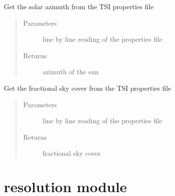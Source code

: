 \documentclass[letterpaper,10pt,english]{sphinxmanual}
\begin{document}

\begin{fulllineitems}
\label{\detokenize{read_properties_file:read_properties_file.get_azimuth}}
Get the solar azimuth from the TSI properties file
\begin{quote}\begin{description}
\item[{Parameters}] \leavevmode
{} \textendash{} line by line reading of the properties file

\item[{Returns}] \leavevmode
azimuth of the sun

\end{description}\end{quote}

\end{fulllineitems}


\begin{fulllineitems}
\label{\detokenize{read_properties_file:read_properties_file.get_fractional_sky_cover_tsi}}
Get the fractional sky cover from the TSI properties file
\begin{quote}\begin{description}
\item[{Parameters}] \leavevmode
{} \textendash{} line by line reading of the properties file

\item[{Returns}] \leavevmode
fractional sky cover

\end{description}\end{quote}

\end{fulllineitems}



\section{resolution module}
\label{\detokenize{resolution:resolution-module}}\label{\detokenize{resolution::doc}}\label{\detokenize{resolution:module-resolution}}
\end{document}
